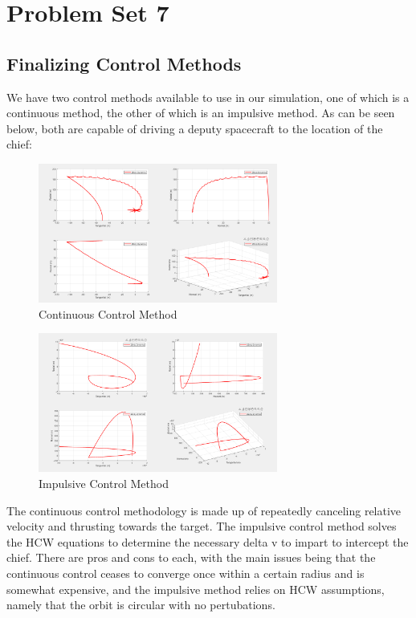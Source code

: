 \section{Problem Set 7}

\subsection{Finalizing Control Methods}

We have two control methods available to use in our simulation, one of which is a continuous method, the other of which is an impulsive method. As can be seen below, both are capable of driving a deputy spacecraft to the location of the chief:

\begin{figure}[H]
    \centering
    \includegraphics[width=0.7\textwidth]{PS7/Figures/position (1).png}
    \caption{Continuous Control Method}
    \label{fig:hcw_velocity}
\end{figure}

\begin{figure}[H]
    \centering
    \includegraphics[width=0.7\textwidth]{PS7/Figures/trajectory (1).png}
    \caption{Impulsive Control Method}
    \label{fig:hcw_velocity}
\end{figure}

The continuous control methodology is made up of repeatedly canceling relative velocity and thrusting towards the target. The impulsive control method solves the HCW equations to determine the necessary delta v to impart to intercept the chief. There are pros and cons to each, with the main issues being that the continuous control ceases to converge once within a certain radius and is somewhat expensive, and the impulsive method relies on HCW assumptions, namely that the orbit is circular with no pertubations.


